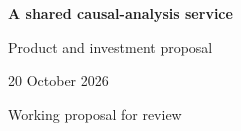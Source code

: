 \documentclass[11pt,a4paper]{article}
\begin{document}
\begin{center}{\LARGE\bfseries A shared causal-analysis service\par}\vspace{3mm}
{\large Product and investment proposal\par}\vspace{2mm}
20 October 2026\par Working proposal for review
\end{center}

\clearpage


\end{document}
